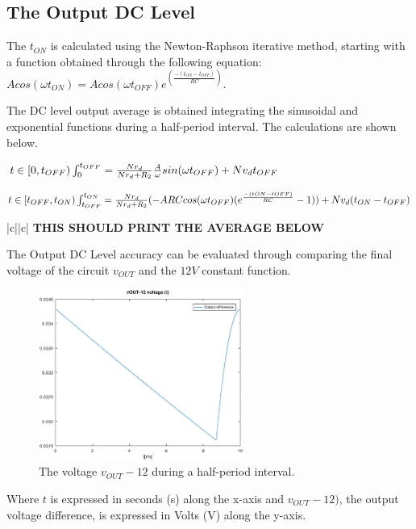 \subsection{The Output DC Level}
\label{subsec:dclevel}

The $t_{ON}$ is calculated using the Newton-Raphson iterative method, starting with a function obtained through the following equation: $Acos(\omega t_{ON})=Acos(\omega t_{OFF})e^(\frac{-(t_{ON}-t_{OFF})}{RC})$.

The DC level output average is obtained integrating the sinusoidal and exponential functions during a half-period interval. The calculations are shown below.

$t\in[0,t_{OFF})\\
\int_{0}^{t_{OFF}}=\frac{N r_d}{N r_d + R_2}\frac{A}{\omega}sin(\omega t_{OFF})+N v_d t_{OFF}\\$

$t\in[t_{OFF},t_{ON})\\
\int_{t_{OFF}}^{t_{ON}}=\frac{N r_d}{N r_d + R_2}(-A R C cos(\omega t_{OFF})(e^{\frac{-({tON}-{tOFF})}{RC}}-1))+N v_d (t_{ON} - t_{OFF})$



\begin{center}
   \begin{tabular}{|c||c|}
      \hline    
       {\bf THIS SHOULD PRINT THE AVERAGE BELOW} \\
      \hline
        
   \end{tabular}
 \end{center}

The Output DC Level accuracy can be evaluated through comparing the final voltage of the circuit $v_{OUT}$ and the $12 V$ constant function. 

\begin{figure}[H] \centering
\includegraphics[width=0.6\textwidth]{outputdiff.eps}
\caption{The voltage $v_{OUT}-12$ during a half-period interval.}
\label{fig:outputdiff}
\end{figure}

Where $t$ is expressed in seconds (s) along the x-axis and 
$v_{OUT}-12)$, the output voltage difference, is expressed in Volts (V) along the y-axis.
